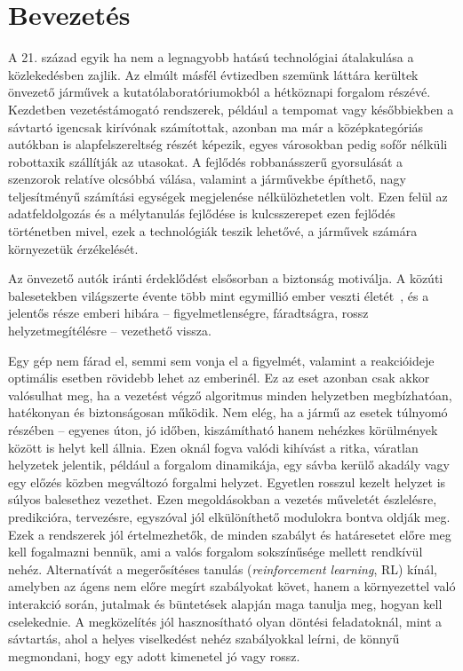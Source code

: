 \documentclass[a4paper,12pt,oneside]{article}
\begin{document}
\section{Bevezetés}
\label{sec:bevezetes}

A 21. század egyik ha nem a legnagyobb hatású technológiai átalakulása a közlekedésben
zajlik. Az elmúlt másfél évtizedben szemünk láttára kerültek önvezető járművek a
kutatólaboratóriumokból a hétköznapi forgalom részévé. Kezdetben vezetéstámogató
rendszerek, például a tempomat vagy későbbiekben a sávtartó igencsak kirívónak számítottak, 
azonban ma már a középkategóriás autókban is alapfelszereltség részét képezik, egyes
városokban pedig sofőr nélküli robottaxik szállítják az utasokat. A fejlődés robbanásszerű gyorsulását
a szenzorok relatíve olcsóbbá válása, valamint a járművekbe építhető, nagy teljesítményű
számítási egységek megjelenése nélkülözhetetlen volt. Ezen felül az adatfeldolgozás és 
a mélytanulás fejlődése is kulcsszerepet ezen fejlődés 
történetben mivel, ezek a technológiák teszik lehetővé, a járművek számára környezetük érzékelését. 

Az önvezető autók iránti érdeklődést elsősorban a biztonság motiválja. A közúti
balesetekben világszerte évente több mint egymillió ember veszti
életét~\cite{who2023roadsafety}, és a jelentős része emberi hibára --
figyelmetlenségre, fáradtságra, rossz helyzetmegítélésre -- vezethető vissza.

Egy gép nem fárad el, semmi sem vonja el a figyelmét, valamint a reakcióideje optimális
esetben rövidebb lehet az emberinél. Ez az eset azonban csak akkor valósulhat meg, ha
a vezetést végző algoritmus minden helyzetben megbízhatóan, hatékonyan és biztonságosan működik. Nem elég,
ha a jármű az esetek túlnyomó részében -- egyenes úton, jó időben, kiszámítható hanem nehézkes körülmények között is helyt kell állnia. 
Ezen oknál fogva valódi kihívást a ritka, váratlan helyzetek jelentik, például a forgalom dinamikája, egy
sávba kerülő akadály vagy egy előzés közben megváltozó forgalmi helyzet. Egyetlen
rosszul kezelt helyzet is súlyos balesethez vezethet. 
Ezen megoldásokban a vezetés műveletét észlelésre, predikcióra, 
tervezésre, egyszóval jól elkülöníthető modulokra bontva oldják meg.
Ezek a rendszerek jól értelmezhetők, de minden szabályt és határesetet előre meg kell
fogalmazni bennük, ami a valós forgalom sokszínűsége mellett rendkívül nehéz.
Alternatívát a megerősítéses tanulás (\emph{reinforcement learning}, RL)
kínál, amelyben az ágens nem előre megírt szabályokat követ, hanem a
környezettel való interakció során, jutalmak és büntetések alapján maga tanulja
meg, hogyan kell cselekednie. A megközelítés jól hasznosítható olyan döntési 
feladatoknál, mint a sávtartás, ahol a helyes viselkedést nehéz 
szabályokkal leírni, de könnyű megmondani, hogy
egy adott kimenetel jó vagy rossz.
\end{document}
